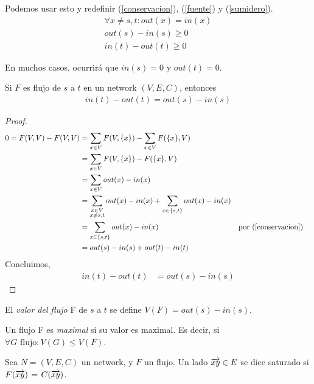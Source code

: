 Podemos usar esto y redefinir (\ref{conservacion}), (\ref{fuente}) y (\ref{sumidero}).
\begin{align}
    \forall x \neq s,t \colon out(x) = in(x)\\
    out(s) - in(s) \ge 0\\
    in(t) - out(t) \ge 0
\end{align}

En muchos casos, ocurrirá que $in(s) = 0$ y $out(t) = 0$.

\begin{proposition}
Si $F$ es flujo de $s$ a $t$ en un network $(V, E, C)$, entonces
\begin{align}
    in(t) - out(t) = out(s) - in(s)
\end{align}
\end{proposition}

\begin{proof}
\begin{align}
  0 = F(V,V) - F(V,V)
  &= \sum_{x \in V} F(V, \{x\}) - \sum_{x\in V} F(\{x\}, V)\\
  &= \sum_{x \in V} F(V, \{x\}) - F(\{x\}, V)\\
  &= \sum_{x \in V} out(x) - in(x)\\
  &= \sum_{\substack{x \in V \\ x \neq s,t}} out(x) - in(x) + \sum_{\substack{x \in \{s,t\}}} out(x) - in(x)\\
  &= \sum_{\substack{x \in \{s,t\}}} out(x) - in(x) &&\text{por (\ref{conservacion})}\\
  &= out(s) - in(s) + out(t) - in(t)
\end{align}
Concluimos,
\begin{align}
  in(t) - out(t) &= out(s) - in(s)
\end{align}
\end{proof}

\begin{definition}
  El \emph{valor del flujo} F de $s$ a $t$ se define $V(F) = out(s) - in(s)$.
\end{definition}

\begin{definition}
  Un flujo F es \emph{maximal} si su valor es maximal. Es decir, si
  $\forall G \text{ flujo} \colon V(G) \le V(F)$.
\end{definition}

\begin{definition}
  Sea $N = (V,E,C)$ un network, y $F$ un flujo. Un lado $\overrightarrow{xy} \in E$ se dice
  saturado si $F(\overrightarrow{xy})$ = $C(\overrightarrow{xy})$.
\end{definition}

